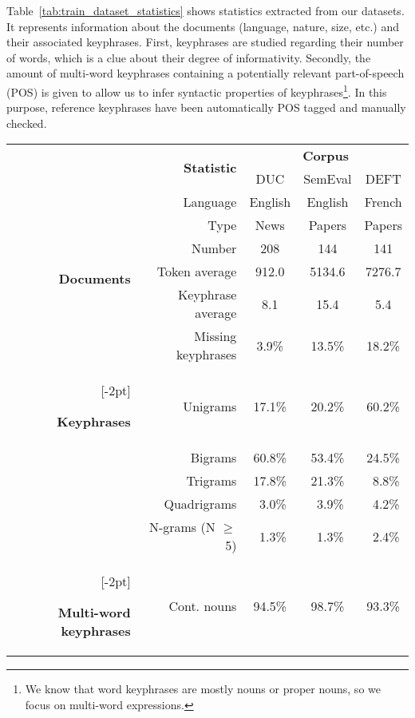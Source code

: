     Table~\ref{tab:train_dataset_statistics} shows statistics extracted from our
    datasets. It represents information about the documents (language, nature,
    size, etc.) and their associated keyphrases. First, keyphrases are studied
    regarding their number of words, which is a clue about their degree of
    informativity. Secondly, the amount of multi-word keyphrases containing a
    potentially relevant part-of-speech (POS) is given to allow us to infer
    syntactic properties of keyphrases\footnote{We know that word keyphrases are
    mostly nouns or proper nouns, so we focus on multi-word expressions.}. In
    this purpose, reference keyphrases have been automatically POS tagged and
    manually checked.
    \begin{table}[h]
      \centering
      \begin{tabular}{@{~}r@{~}r@{~}c@{~}c@{~}c@{~}}
        \toprule
        & \multirow{2}{*}[-2pt]{\textbf{Statistic}} & \multicolumn{3}{c}{\textbf{Corpus}}\\
        \cmidrule{3-5}
        & & DUC & SemEval & DEFT\\
        \midrule
        \multirow{6}{*}[-2pt]{\begin{sideways}\textbf{Documents}\end{sideways}} & Language & English & English & French\\
        & Type & News & Papers & Papers\\
        & Number & 208 & 144 & 141\\
        & Token average & 912.0 & 5134.6 & 7276.7\\
        & Keyphrase average & 8.1 & 15.4 & 5.4\\
        & Missing keyphrases & 3.9\% & 13.5\% & 18.2\%\\
        \addlinespace[1.5\defaultaddspace]
        \multirow{5}{*}[-2pt]{\begin{sideways}\textbf{Keyphrases}\end{sideways}} & Unigrams & 17.1\% & 20.2\% & 60.2\%\\
        & Bigrams & 60.8\% & 53.4\% & 24.5\%\\
        & Trigrams & 17.8\% & 21.3\% & $~~$8.8\%\\
        & Quadrigrams & $~~$3.0\% & $~~$3.9\% & $~~$4.2\%\\
        & N-grams (N $\geq$ 5) & $~~$1.3\% & $~~$1.3\% & $~~$2.4\%\\
        \addlinespace[1.5\defaultaddspace]
        \multirow{5}{*}[-2pt]{\begin{sideways}\textbf{Multi-word keyphrases}\end{sideways}} & Cont. nouns & 94.5\% & 98.7\% & 93.3\%\\

\end{tabular}
\end{table}
